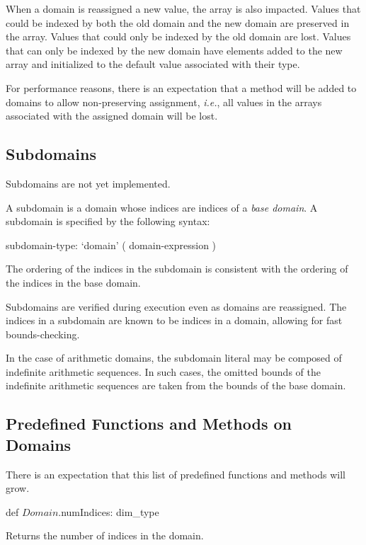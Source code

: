 When a domain is reassigned a new value, the array is also impacted.
Values that could be indexed by both the old domain and the new domain
are preserved in the array.  Values that could only be indexed by the
old domain are lost.  Values that can only be indexed by the new
domain have elements added to the new array and initialized to the
default value associated with their type.

For performance reasons, there is an expectation that a method will be
added to domains to allow non-preserving assignment, {\em i.e.}, all
values in the arrays associated with the assigned domain will be lost.

\subsection{Subdomains}
\label{Subdomains}

\begin{implementation}
Subdomains are not yet implemented.
\end{implementation}

A subdomain is a domain whose indices are indices of a {\em base
  domain}.  A subdomain is specified by the following syntax:
\begin{syntax}
subdomain-type:
  `domain' ( domain-expression )
\end{syntax}
The ordering of the indices in the subdomain is consistent with the
ordering of the indices in the base domain.

Subdomains are verified during execution even as domains are
reassigned.  The indices in a subdomain are known to be indices in a
domain, allowing for fast bounds-checking.

In the case of arithmetic domains, the subdomain literal may be
composed of indefinite arithmetic sequences.  In such cases, the
omitted bounds of the indefinite arithmetic sequences are taken from
the bounds of the base domain.

\subsection{Predefined Functions and Methods on Domains}

There is an expectation that this list of predefined functions and
methods will grow.

\begin{protohead}
def $Domain$.numIndices: dim_type
\end{protohead}
\begin{protobody}
Returns the number of indices in the domain.
\end{protobody}

